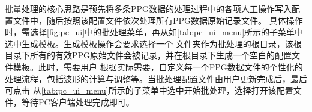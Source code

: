 批量处理的核心思路是预先将多条PPG数据的处理过程中的各项人工操作写入配置文件中，随后按照该配置文件依次处理所有PPG数据原始记录文件。
具体操作时，需选择\autoref{fig:pc_ui}中的批处理菜单，再从如\autoref{tab:pc_ui_menu}所示的子菜单中选中生成模板。生成模板操作会要求选择一个
文件夹作为批处理的根目录，该根目录下所有的有效PPG原始文件会被记录，并在根目录下生成一个空白的配置文件模板。此时，需要用户
根据实际需要，自定义每一个PPG数据文件的个性化的处理流程，包括波形的计算与调整等。当批处理配置文件由用户更新完成后，最后可点击
从\autoref{tab:pc_ui_menu}所示的子菜单中选中开始批处理，选择打开该配置文件，等待PC客户端处理完成即可。

